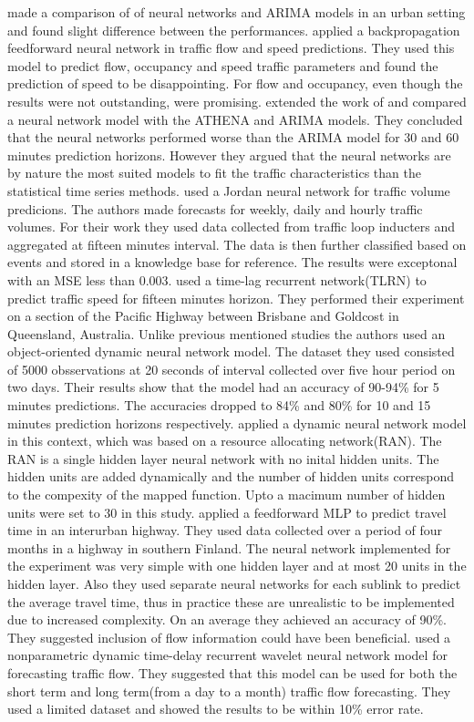 \citet{clark1993use} made a comparison of of neural networks and ARIMA models in an urban setting
and found slight difference between the performances. \citet{dougherty1997short} applied a
backpropagation feedforward neural network in traffic flow and speed predictions. They used this
model to predict flow, occupancy and speed traffic parameters and found the prediction of speed to
be disappointing. For flow and occupancy, even though the results were not outstanding, were promising.
\citet{kirby1997should} extended the work of \citet{clark1993use} and compared a neural network model
with the ATHENA and ARIMA models. They concluded that the neural networks performed worse than the
ARIMA model for 30 and 60 minutes prediction horizons. However they argued that the neural networks
are by nature the most suited models to fit the traffic characteristics than the statistical time
series methods. \citet{yasdi1999prediction} used a Jordan neural network for traffic volume predicions.
The authors made forecasts for weekly, daily and hourly traffic volumes. For their work they used
data collected from traffic loop inducters and aggregated at fifteen minutes interval. The data is
then further classified based on events and stored in a knowledge base for reference. The results were
exceptonal with an MSE less than 0.003. \citet{dia2001object} used a time-lag recurrent network(TLRN)
to predict traffic speed for fifteen minutes horizon. They performed their experiment on a section
of the Pacific Highway between Brisbane and Goldcost in Queensland, Australia. Unlike previous mentioned
studies the authors used an object-oriented dynamic neural network model. The dataset they used consisted
of 5000 obsservations at 20 seconds of interval collected over five hour period on two days. Their results
show that the model had an accuracy of 90-94\% for 5 minutes predictions. The accuracies dropped
to 84\% and 80\% for 10 and 15 minutes prediction horizons respectively.
\citet{chen2001use} applied a dynamic neural network model in this context, which was based on a
resource allocating network(RAN). The RAN is a single hidden layer neural network with no inital hidden
units. The hidden units are added dynamically and the number of hidden units correspond to the compexity
of the mapped function. Upto a macimum number of hidden units were set to 30 in this study.
\citet{innamaa2005short}applied a feedforward MLP to predict travel time in an interurban highway.
They used data collected over a period of four months in a highway in southern Finland. The neural
network implemented for the experiment was very simple with one hidden layer and at most 20 units in
the hidden layer. Also they used separate neural networks for each sublink to predict the average
travel time, thus in practice these are unrealistic to be implemented due to increased complexity.
On an average they achieved an accuracy of 90\%. They suggested inclusion of flow information could
have been beneficial. \citet{jiang2005dynamic} used a nonparametric dynamic time-delay recurrent
wavelet neural network model for forecasting traffic flow. They suggested that this model can be
used for both the short term and long term(from a day to a month) traffic flow forecasting. They
used a limited dataset and showed the results to be within 10\% error rate.


